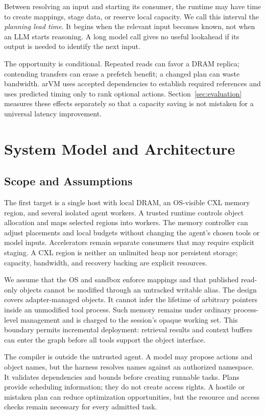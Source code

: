 \documentclass[letterpaper,twocolumn,10pt]{article}
\newcommand{\arvm}{arVM\xspace}
\begin{document}
Between resolving an input and starting its consumer, the runtime may have
time to create mappings, stage data, or reserve local capacity. We call this
interval the \emph{planning lead time}. It begins when the relevant input
becomes known, not when an LLM starts reasoning. A long model call gives no
useful lookahead if its output is needed to identify the next input.

The opportunity is conditional. Repeated reads can favor a DRAM replica;
contending transfers can erase a prefetch benefit; a changed plan can waste
bandwidth. \arvm uses accepted dependencies to establish required references
and uses predicted timing only to rank optional actions. Section~\ref{sec:evaluation}
measures these effects separately so that a capacity saving is not mistaken
for a universal latency improvement.

\section{System Model and Architecture}
\label{sec:architecture}

\subsection{Scope and Assumptions}

The first target is a single host with local DRAM, an OS-visible CXL memory
region, and several isolated agent workers. A trusted runtime controls object
allocation and maps selected regions into workers. The memory controller can
adjust placements and local budgets without changing the agent's chosen tools
or model inputs. Accelerators remain separate consumers that may require
explicit staging. A CXL region is neither an unlimited heap nor persistent
storage; capacity, bandwidth, and recovery backing are explicit resources.

We assume that the OS and sandbox enforce mappings and that published
read-only objects cannot be modified through an untracked writable alias.
The design covers adapter-managed objects. It cannot infer the lifetime of
arbitrary pointers inside an unmodified tool process. Such memory remains
under ordinary process-level management and is charged to the session's
opaque working set. This boundary permits incremental deployment: retrieval
results and context buffers can enter the graph before all tools support the
object interface.

The compiler is outside the untrusted agent. A model may propose actions and
object names, but the harness resolves names against an authorized namespace.
It validates dependencies and bounds before creating runnable tasks. Plans
provide scheduling information; they do not create access rights. A hostile
or mistaken plan can reduce optimization opportunities, but the resource and
access checks remain necessary for every admitted task.
\end{document}
